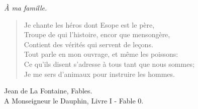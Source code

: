 \cleardoublepage

\vspace*{\fill}
{\hfill\sffamily\itshape \`A ma famille.}
\cleardoublepage

\rmfamily
\normalfont



\begin{changemargin}{6cm}{-3cm}
{\sffamily
\itshape
\begin{quote}
Je chante les héros dont Esope est le père,  \\
Troupe de qui l'histoire, encor que mensongère, \\ 
Contient des vérités qui servent de leçons. \\
Tout parle en mon ouvrage, et même les poissons: \\
Ce qu'ils disent s'adresse à tous tant que nous sommes; \\
Je me sers d'animaux pour instruire les hommes.\\
\end{quote}
}
\sffamily
\begin{flushleft}
Jean de La Fontaine, Fables.\\
A Monseigneur le Dauphin,
Livre I - Fable 0.
\end{flushleft}
\end{changemargin}

\vspace*{\fill}

\cleardoublepage

\rmfamily
\normalfont

\pagestyle{headings}
\tableofcontents

